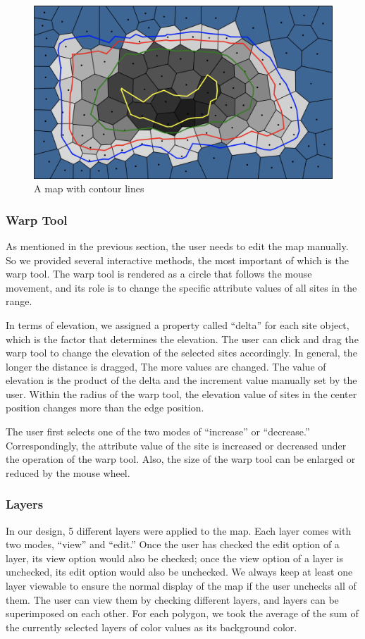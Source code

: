 \begin{figure}[htbp]
  \includegraphics[width=\textwidth]{section04/assets/Map-contourline.png}
  \caption{A map with contour lines}
  \label{fig:contour line}
\end{figure}

\subsubsection{Warp Tool}
As mentioned in the previous section, the user needs to edit the map manually. So we provided several interactive methods, the most important of which is the warp tool. The warp tool is rendered as a circle that follows the mouse movement, and its role is to change the specific attribute values of all sites in the range.

In terms of elevation, we assigned a property called ``delta'' for each site object, which is the factor that determines the elevation. The user can click and drag the warp tool to change the elevation of the selected sites accordingly. In general, the longer the distance is dragged, The more values are changed. The value of elevation is the product of the delta and the increment value manually set by the user. Within the radius of the warp tool, the elevation value of sites in the center position changes more than the edge position.

The user first selects one of the two modes of ``increase'' or ``decrease.'' Correspondingly, the attribute value of the site is increased or decreased under the operation of the warp tool. Also, the size of the warp tool can be enlarged or reduced by the mouse wheel.

\subsubsection{Layers}
In our design, 5 different layers were applied to the map. Each layer comes with two modes, ``view'' and ``edit.'' Once the user has checked the edit option of a layer, its view option would also be checked; once the view option of a layer is unchecked, its edit option would also be unchecked. We always keep at least one layer viewable to ensure the normal display of the map if the user unchecks all of them. The user can view them by checking different layers, and layers can be superimposed on each other. For each polygon, we took the average of the sum of the currently selected layers of color values as its background color.

